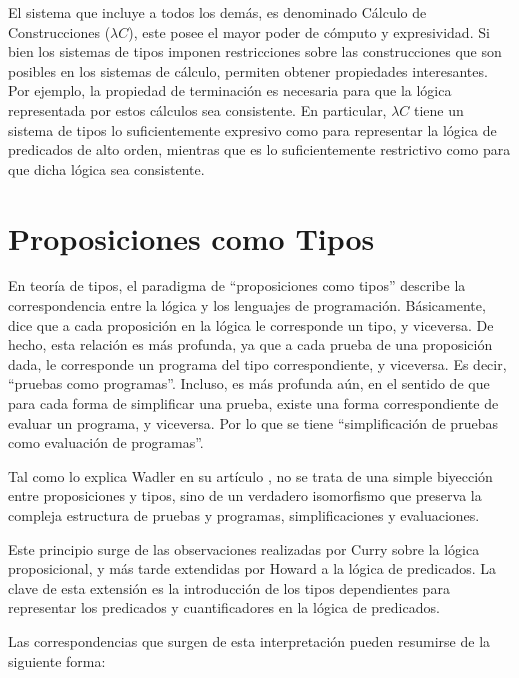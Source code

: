El sistema que incluye a todos los demás, es denominado Cálculo de Construcciones ($\lambda C$), este posee el mayor poder de cómputo y expresividad.
Si bien los sistemas de tipos imponen restricciones sobre las construcciones que son posibles en los sistemas de cálculo, permiten obtener propiedades interesantes.
Por ejemplo, la propiedad de terminación es necesaria para que la lógica representada por estos cálculos sea consistente.
En particular, $\lambda C$ tiene un sistema de tipos lo suficientemente expresivo como para representar la lógica de predicados de alto orden, mientras que es lo suficientemente restrictivo como para que dicha lógica sea consistente.


\section{Proposiciones como Tipos}
En teoría de tipos, el paradigma de ``proposiciones como tipos'' describe la correspondencia entre la lógica y los lenguajes de programación.
Básicamente, dice que a cada proposición en la lógica le corresponde un tipo, y viceversa.
De hecho, esta relación es más profunda, ya que a cada prueba de una proposición dada, le corresponde un programa del tipo correspondiente, y viceversa.
Es decir, ``pruebas como programas''.
Incluso, es más profunda aún, en el sentido de que para cada forma de simplificar una prueba, existe una forma correspondiente de evaluar un programa, y viceversa.
Por lo que se tiene ``simplificación de pruebas como evaluación de programas''.

Tal como lo explica Wadler en su artículo \cite{pas}, no se trata de una simple biyección entre proposiciones y tipos, sino de un verdadero isomorfismo que preserva la compleja estructura de pruebas y programas, simplificaciones y evaluaciones.

Este principio surge de las observaciones realizadas por Curry \cite{Curry} sobre la lógica proposicional, y más tarde extendidas por Howard \cite{Howard} a la lógica de predicados.
La clave de esta extensión es la introducción de los tipos dependientes para representar los predicados y cuantificadores en la lógica de predicados.

Las correspondencias que surgen de esta interpretación pueden resumirse de la siguiente forma:

